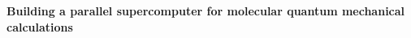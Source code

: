 

\setlength{\textwidth}{7in}
\setlength{\textheight}{9.0in}
\setlength{\oddsidemargin}{-.25in}
%
\setlength{\topmargin}{-.10in}
\def\Real{\rm I\hspace{-0.2em}R}
\def\nin{{\in \! \! \! \! \! /} \,}
\def\nequiv{{\equiv \! \! \! \! \! \! /} \,}

\newcommand{\half}{\mbox{$\frac{1}{2}$}}
\newcommand{\mul}{\multicolumn{2}{c}{none}}
\newcommand{\qua}{\mbox{$\frac{1}{4}$}}
\newcommand{\six}{\mbox{$\frac{1}{6}$}}
\newcommand{\tfour}{\mbox{$\frac{1}{24}$}}
\newcommand{\beq}{\begin{equation}}
\newcommand{\eeq}{\end{equation}}
\newcommand{\tripler}{T_{3}\!\left(^{a^{\prime}b^{\prime}
{\rm C}^{\prime}}_{{\rm I}^{\prime}j^{\prime}k^{\prime}}\right)}
\newcommand{\quadrupler}{T_{4}\!\left(^{a^{\prime}b^{\prime}
{\rm C}^{\prime}{\rm D}^{\prime}}_{{\rm I}^{\prime}{\rm J}^{\prime}
k^{\prime}l^{\prime}}\right)}






\setlength{\baselineskip}{1em}


\noindent
{\bf Building a parallel supercomputer for molecular
quantum mechanical calculations}




